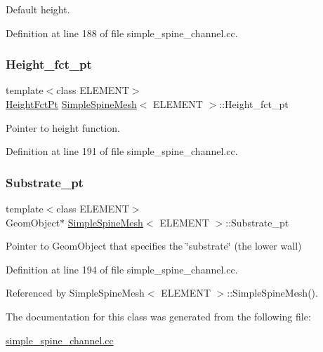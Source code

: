 Default height. 



Definition at line 188 of file simple\+\_\+spine\+\_\+channel.\+cc.

\mbox{\label{classSimpleSpineMesh_ac0509d0d0868d37ef87834b39d2a084b}} 
\subsubsection{\texorpdfstring{Height\+\_\+fct\+\_\+pt}{Height\_fct\_pt}}
{\footnotesize\ttfamily template$<$class E\+L\+E\+M\+E\+NT$>$ \\
\hyperlink{classSimpleSpineMesh_a671d96f0143dfeb7aaba8af56c0c0620}{Height\+Fct\+Pt} \hyperlink{classSimpleSpineMesh}{Simple\+Spine\+Mesh}$<$ E\+L\+E\+M\+E\+NT $>$\+::Height\+\_\+fct\+\_\+pt\hspace{0.3cm}{\ttfamily [private]}}



Pointer to height function. 



Definition at line 191 of file simple\+\_\+spine\+\_\+channel.\+cc.

\mbox{\label{classSimpleSpineMesh_a9031e27d5855e029312d356f6a38da76}} 
\subsubsection{\texorpdfstring{Substrate\+\_\+pt}{Substrate\_pt}}
{\footnotesize\ttfamily template$<$class E\+L\+E\+M\+E\+NT$>$ \\
Geom\+Object$\ast$ \hyperlink{classSimpleSpineMesh}{Simple\+Spine\+Mesh}$<$ E\+L\+E\+M\+E\+NT $>$\+::Substrate\+\_\+pt\hspace{0.3cm}{\ttfamily [private]}}



Pointer to Geom\+Object that specifies the \char`\"{}substrate\char`\"{} (the lower wall) 



Definition at line 194 of file simple\+\_\+spine\+\_\+channel.\+cc.



Referenced by Simple\+Spine\+Mesh$<$ E\+L\+E\+M\+E\+N\+T $>$\+::\+Simple\+Spine\+Mesh().



The documentation for this class was generated from the following file\+:\begin{DoxyCompactItemize}
\item 
\hyperlink{simple__spine__channel_8cc}{simple\+\_\+spine\+\_\+channel.\+cc}\end{DoxyCompactItemize}
